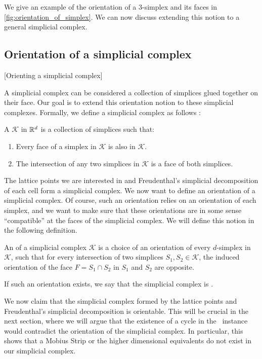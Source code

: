 We give an example of the orientation of a 3-simplex and its faces in \cref{fig:orientation_of_simplex}. We can now discuss extending this notion to a general simplicial complex.

\subsection{Orientation of a simplicial complex}[Orienting a simplicial complex]

A simplicial complex can be considered a collection of simplices glued together on their face. Our goal is to extend this orientation notion to these simplicial complexes. Formally, we define a simplicial complex as follows :

\begin{definition}
	A  $\mathcal{K}$ in $\mathbb{R}^d$ is a collection of simplices such that:
	\begin{enumerate}
		\item Every face of a simplex in $\mathcal{K}$ is also in $\mathcal{K}$.
		\item The intersection of any two simplices in $\mathcal{K}$ is a face of both simplices.
	\end{enumerate}
\end{definition}

The lattice points we are interested in and Freudenthal's simplicial decomposition of each cell form a simplicial complex. We now want to define an orientation of a simplicial complex. Of course, such an orientation relies on an orientation of each simplex, and we want to make sure that these orientations are in some sense ``compatible'' at the faces of the simplicial complex. We will define this notion in the following definition.

\begin{definition}
	An  of a simplicial complex $\mathcal{K}$ is a choice of an orientation of every $d$-simplex in $\mathcal{K}$, such that for every intersection of two simplices $S_1, S_2 \in \mathcal{K}$, the induced orientation of the face $F = S_1 \cap S_2$ in $S_1$ and $S_2$ are opposite. \par
	If such an orientation exists, we say that the simplicial complex is .
\end{definition}

We now claim that the simplicial complex formed by the lattice points and Freudenthal's simplicial decomposition is orientable. This will be crucial in the next section, where we will argue that the existence of a cycle in the \EndOfLine\ instance would contradict the orientation of the simplicial complex. In particular, this shows that a Mobius Strip or the higher dimensional equivalents do not exist in our simplicial complex.

